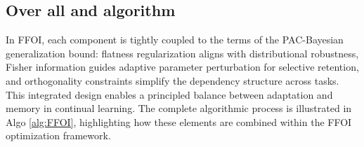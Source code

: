 \documentclass[letterpaper]{article} %
\begin{document}
\subsection{Over all and algorithm}


In FFOI, each component is tightly coupled to the terms of the PAC-Bayesian generalization bound: flatness regularization aligns with distributional robustness, Fisher information guides adaptive parameter perturbation for selective retention, and orthogonality constraints simplify the dependency structure across tasks. This integrated design enables a principled balance between adaptation and memory in continual learning. The complete algorithmic process is illustrated in Algo \ref{alg:FFOI}, highlighting how these elements are combined within the FFOI optimization framework.



\end{document}
